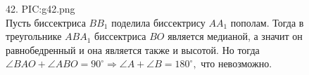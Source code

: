 42. {{PIC:g42.png}}\\
Пусть биссектриса $BB_1$ поделила биссектрису $AA_1$ пополам. Тогда в треугольнике $ABA_1$ биссектриса $BO$ является медианой, а значит он равнобедренный и она является также и высотой. Но тогда $\angle BAO+\angle ABO=90^\circ\Rightarrow \angle A+\angle B=180^\circ,$ что невозможно.\\
